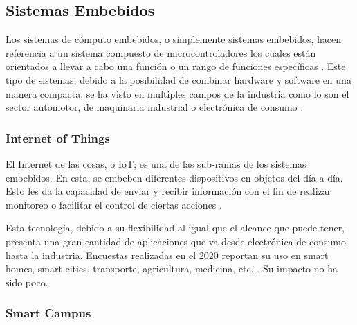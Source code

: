 \documentclass[12pt]{article}
\begin{document}
    \subsection{Sistemas Embebidos}
    

    Los sistemas de cómputo embebidos, o simplemente sistemas embebidos, hacen referencia a un sistema compuesto de microcontroladores los cuales están orientados a llevar a cabo una función o un rango de funciones específicas \cite{heath2002embedded}. Este tipo de sistemas, debido a la posibilidad de combinar hardware y software en una manera compacta, se ha visto en multiples campos de la industria como lo son el sector automotor, de maquinaria industrial o electrónica de consumo \cite{deichmann_2022}.


    \subsubsection*{Internet of Things}


    El Internet de las cosas, o IoT; es una de las sub-ramas de los sistemas embebidos. En esta, se embeben diferentes dispositivos en objetos del día a día. Esto les da la capacidad de enviar y recibir información con el fin de realizar monitoreo o facilitar el control de ciertas acciones \cite{Berte_2018}.

    Esta tecnología, debido a su flexibilidad al igual que el alcance que puede tener, presenta una gran cantidad de aplicaciones que va desde electrónica de consumo hasta la industria. Encuestas realizadas en el 2020 reportan su uso en smart homes, smart cities, transporte, agricultura, medicina, etc. \cite{Dawood_2020}. Su impacto no ha sido poco.


    \subsubsection*{Smart Campus}

\end{document}
